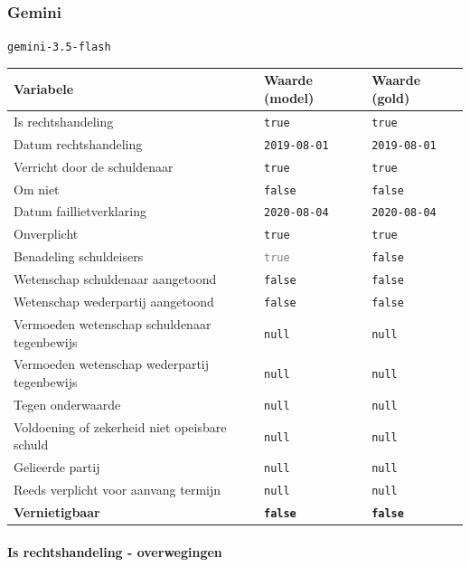 \documentclass[
  dutch,
  a4paper,
]{article}
\begin{document}
\newpage


\subsubsection{Gemini}\label{gemini-13}

\texttt{gemini-3.5-flash}

\begin{center}
\small
\begin{tabular}{@{}p{7.4cm}p{2.6cm}p{2.6cm}@{}}
\toprule
Variabele & Waarde (model) & Waarde (gold) \\
\midrule
Is rechtshandeling & \texttt{true} & \texttt{true} \\
Datum rechtshandeling & \texttt{2019-08-01} & \texttt{2019-08-01} \\
Verricht door de schuldenaar & \texttt{true} & \texttt{true} \\
Om niet & \texttt{false} & \texttt{false} \\
Datum faillietverklaring & \texttt{2020-08-04} & \texttt{2020-08-04} \\
Onverplicht & \texttt{true} & \texttt{true} \\
Benadeling schuldeisers & \textcolor{gray}{\texttt{true}} & \texttt{false} \\
Wetenschap schuldenaar aangetoond & \texttt{false} & \texttt{false} \\
Wetenschap wederpartij aangetoond & \texttt{false} & \texttt{false} \\
Vermoeden wetenschap schuldenaar tegenbewijs & \texttt{null} & \texttt{null} \\
Vermoeden wetenschap wederpartij tegenbewijs & \texttt{null} & \texttt{null} \\
Tegen onderwaarde & \texttt{null} & \texttt{null} \\
Voldoening of zekerheid niet opeisbare schuld & \texttt{null} & \texttt{null} \\
Gelieerde partij & \texttt{null} & \texttt{null} \\
Reeds verplicht voor aanvang termijn & \texttt{null} & \texttt{null} \\
\textbf{Vernietigbaar} & \textbf{\texttt{false}} & \textbf{\texttt{false}} \\
\bottomrule
\end{tabular}
\end{center}

\paragraph{Is rechtshandeling - overwegingen}\label{is-rechtshandeling---overwegingen-41}
\end{document}
